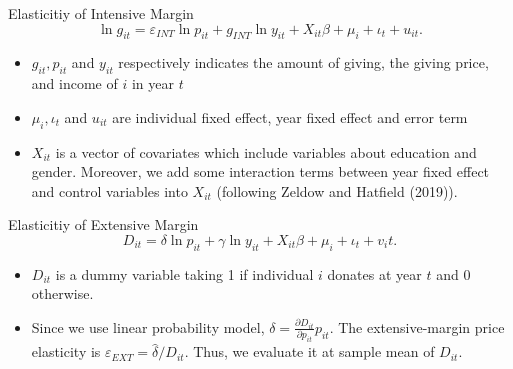 \documentclass[
  ignorenonframetext,
]{beamer}
\providecommand{\tightlist}{%
  \setlength{\itemsep}{0pt}\setlength{\parskip}{0pt}}
\begin{document}
\begin{frame}{Elasticitiy of Intensive Margin}
\protect\hypertarget{elasticitiy-of-intensive-margin}{}
\[
\ln g_{it} = \varepsilon_{INT} \ln p_{it} +g_{INT} \ln y_{it} + X_{it}\beta +\mu_i +\iota_t +u_{it}. \label{eq:intensive}
\]

\begin{itemize}
\tightlist
\item
  \(g_{it}, p_{it}\) and \(y_{it}\) respectively indicates the amount of giving, the giving price, and income of \(i\) in year \(t\)
\item
  \(\mu_i, \iota_t\) and \(u_{it}\) are individual fixed effect, year fixed effect and error term
\item
  \(X_{it}\) is a vector of covariates which include variables about education and gender. Moreover, we add some interaction terms between year fixed effect and control variables into \(X_{it}\) (following Zeldow and Hatfield (2019)).
\end{itemize}
\end{frame}

\begin{frame}{Elasticitiy of Extensive Margin}
\protect\hypertarget{elasticitiy-of-extensive-margin}{}
\[
D_{it} =  \delta \ln p_{it} +\gamma \ln y_{it} + X_{it}\beta+\mu_i  +\iota_t +v_it. \label{extensive}
\]

\begin{itemize}
\tightlist
\item
  \(D_{it}\) is a dummy variable taking 1 if individual \(i\) donates at year \(t\) and 0 otherwise.
\item
  Since we use linear probability model, \(\delta = \frac{\partial D_{it}}{\partial p_{it}} p_{it}\). The extensive-margin price elasticity is \(\varepsilon_{EXT} = \hat{\delta}/D_{it}\). Thus, we evaluate it at sample mean of \(D_{it}\).
\end{itemize}
\end{frame}
\end{document}
